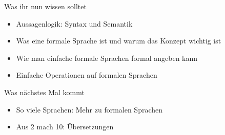 


%



%

\begin{frame}	
	\begin{block}{Was ihr nun wissen solltet}
		\begin{itemize}
			\item Aussagenlogik: Syntax und Semantik
			\item Was eine formale Sprache ist und warum das Konzept wichtig ist
			\item Wie man einfache formale Sprachen formal angeben kann
			\item Einfache Operationen auf formalen Sprachen
		\end{itemize}
	\end{block}
	
	\begin{block}{Was nächstes Mal kommt}
		\begin{itemize}
			\item So viele Sprachen: Mehr zu formalen Sprachen
			\item Aus 2 mach 10: Übersetzungen
		\end{itemize}
	\end{block}
\end{frame}

\slideThanks


